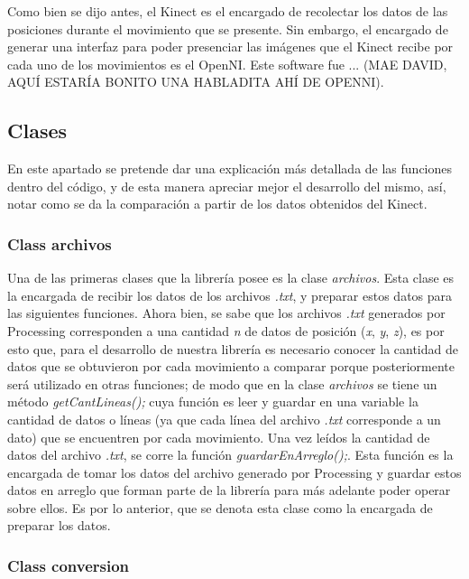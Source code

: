 \documentclass[letterpaper]{article}
\begin{document}
\quad \quad Como bien se dijo antes, el Kinect es el encargado de recolectar los datos de las posiciones durante el movimiento que se presente. Sin embargo, el encargado de generar una interfaz para poder presenciar las imágenes que 
el Kinect recibe por cada uno de los movimientos es el OpenNI. Este software fue ... (MAE DAVID, AQUÍ ESTARÍA BONITO UNA HABLADITA AHÍ DE OPENNI). 



\subsection{Clases}
\quad \quad En este apartado se pretende dar una explicación más detallada de las funciones dentro del código, y de esta manera apreciar mejor el desarrollo del mismo, así, notar como se da la comparación a partir de los datos 
obtenidos del Kinect. 

\subsubsection{Class archivos}

\quad \quad Una de las primeras clases que la librería posee es la clase \textit{archivos}. Esta clase es la encargada de recibir los datos de los archivos \textit{.txt}, y preparar estos datos para las siguientes funciones.
Ahora bien, se sabe que los archivos \textit{.txt} generados por Processing corresponden a una cantidad \textit{n} de datos de posición (\textit{x}, \textit{y}, \textit{z}), es por esto que, para el desarrollo de nuestra
librería es necesario conocer la cantidad de datos que se obtuvieron por cada movimiento a comparar porque posteriormente será utilizado en otras funciones; de modo que en la clase \textit{archivos} se tiene un método \textit{getCantLineas();} 
cuya función es leer y guardar en una variable la cantidad de datos o líneas (ya que cada línea del archivo \textit{.txt} corresponde a un dato) que se encuentren por cada movimiento. 
Una vez leídos la cantidad de datos del archivo \textit{.txt}, se corre la función \textit{guardarEnArreglo();}. Esta función es la encargada de tomar los datos del archivo generado por Processing y guardar estos datos en arreglo que forman parte de la librería
para más adelante poder operar sobre ellos. Es por lo anterior, que se denota esta clase como la encargada de preparar los datos.

\subsubsection{Class conversion}
\end{document}
